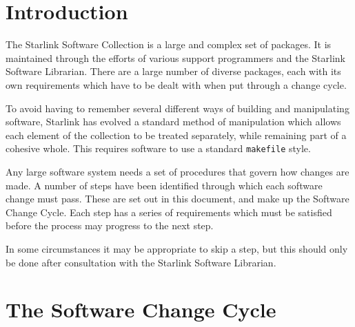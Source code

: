 \stardocabstract
  \newpage
 \begin{latexonly}
   \setlength{\parskip}{0mm}
   \latexonlytoc
   \setlength{\parskip}{\medskipamount}
   \markboth{\stardocname}{\stardocname}
 \end{latexonly}

\cleardoublepage
\markboth{\stardocname}{\stardocname}
\renewcommand{\thepage}{\arabic{page}}
\setcounter{page}{1}

\section{\label{introduction}Introduction}

The Starlink Software Collection is a large and complex set of packages.
It is maintained through the efforts of various support programmers and 
the Starlink Software Librarian.  There are a large number of diverse
packages, each with its own requirements which have to be dealt with 
when put through a change cycle.

To avoid having to remember several different ways of building and
manipulating software, Starlink has evolved a standard method of
manipulation which allows each element of the collection to be
treated separately, while remaining part of a cohesive whole.  This requires
software to use a standard {\tt{makefile}} style.

Any large software system needs a set of procedures that govern how
changes are made.  A number of steps have been identified through
which each software change must pass.  These are set out in this
document, and make up the Software Change Cycle.  Each step has a
series of requirements which must be satisfied before the process may
progress to the next step.

In some circumstances it may be appropriate to skip a step, but this
should only be done after consultation with the Starlink Software
Librarian.

\section{\label{the_software_change_cycle}The Software Change Cycle}

